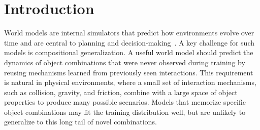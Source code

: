 \documentclass{article}
\newcommand{\ours}{\textsc{CausalComp}}
\begin{document}




\section{Introduction}
\label{sec:intro}

World models are internal simulators that predict how environments evolve over time and are central to planning and decision-making~\citep{ha2018worldmodels,lecun2022jepa,hafner2025dreamerv3}. A key challenge for such models is compositional generalization. A useful world model should predict the dynamics of object combinations that were never observed during training by reusing mechanisms learned from previously seen interactions. This requirement is natural in physical environments, where a small set of interaction mechanisms, such as collision, gravity, and friction, combine with a large space of object properties to produce many possible scenarios. Models that memorize specific object combinations may fit the training distribution well, but are unlikely to generalize to this long tail of novel combinations.
\end{document}
